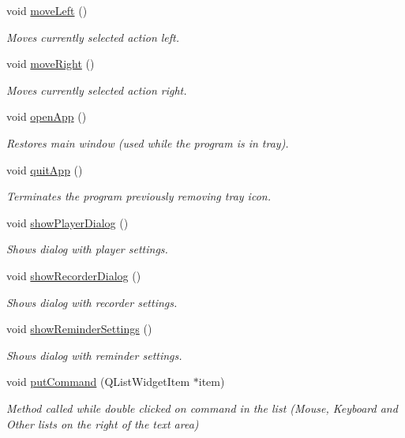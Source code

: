 \begin{DoxyCompactItemize}
void \hyperlink{classmain_win_a6d480f5086986eaeeed93a4c3157f0df}{move\-Left} ()
\begin{DoxyCompactList}\small\item\em Moves currently selected action left. \end{DoxyCompactList}\item 
void \hyperlink{classmain_win_aa46d4ec0613b07140463723017711235}{move\-Right} ()
\begin{DoxyCompactList}\small\item\em Moves currently selected action right. \end{DoxyCompactList}\item 
void \hyperlink{classmain_win_acb51cccbafc4c963ef55ef6d517c60c7}{open\-App} ()
\begin{DoxyCompactList}\small\item\em Restores main window (used while the program is in tray). \end{DoxyCompactList}\item 
void \hyperlink{classmain_win_abacc60b864c8156cbeb235b516a3be05}{quit\-App} ()
\begin{DoxyCompactList}\small\item\em Terminates the program previously removing tray icon. \end{DoxyCompactList}\item 
void \hyperlink{classmain_win_acd3db954dc70fc3617f27c6f9420f17f}{show\-Player\-Dialog} ()
\begin{DoxyCompactList}\small\item\em Shows dialog with player settings. \end{DoxyCompactList}\item 
void \hyperlink{classmain_win_af2e858659b60c8d32a04fd0334e051c6}{show\-Recorder\-Dialog} ()
\begin{DoxyCompactList}\small\item\em Shows dialog with recorder settings. \end{DoxyCompactList}\item 
void \hyperlink{classmain_win_a4e24b67b194285df264d18afaeafcaba}{show\-Reminder\-Settings} ()
\begin{DoxyCompactList}\small\item\em Shows dialog with reminder settings. \end{DoxyCompactList}\item 
void \hyperlink{classmain_win_a80442454fb91a3cf4bc4a5dca3d2c99a}{put\-Command} (Q\-List\-Widget\-Item $\ast$item)
\begin{DoxyCompactList}\small\item\em Method called while double clicked on command in the list (Mouse, Keyboard and Other lists on the right of the text area) \end{DoxyCompactList}\end{DoxyCompactItemize}
